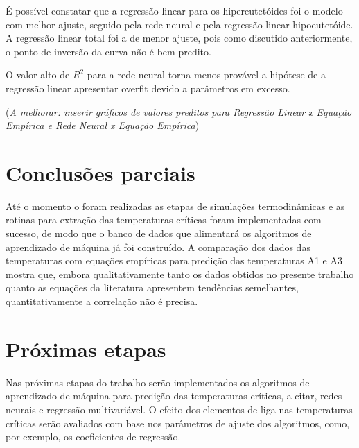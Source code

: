 \documentclass[brazil,tf,epusp]{usp}  %
\begin{document}
É possível constatar que a regressão linear para os hipereutetóides foi o modelo com melhor ajuste, seguido pela rede neural e pela regressão linear hipoeutetóide. A regressão linear total foi a de menor ajuste, pois como discutido anteriormente, o ponto de inversão da curva não é bem predito.

O valor alto de $R^{2}$ para a rede neural torna menos provável a hipótese de a regressão linear apresentar overfit devido a parâmetros em excesso.

(\textit{A melhorar: inserir gráficos de valores preditos para Regressão Linear x Equação Empírica e Rede Neural x Equação Empírica})

\chapter{Conclusões parciais}

Até o momento o foram realizadas as etapas de simulações termodinâmicas e as rotinas para extração das temperaturas críticas foram implementadas com sucesso, de modo que o banco de dados que alimentará os algoritmos de aprendizado de máquina já foi construído. A comparação dos dados das temperaturas com equações empíricas para predição das temperaturas A1 e A3 mostra que, embora qualitativamente tanto os dados obtidos no presente trabalho quanto as equações da literatura apresentem tendências semelhantes, quantitativamente a correlação não é precisa.

\chapter{Próximas etapas}

Nas próximas etapas do trabalho serão implementados os algoritmos de aprendizado de máquina para predição das temperaturas críticas, a citar, redes neurais e regressão multivariável. O efeito dos elementos de liga nas temperaturas críticas serão avaliados com base nos parâmetros de ajuste dos algoritmos, como, por exemplo, os coeficientes de regressão.





\label{an:diag_bin}
\end{document}
